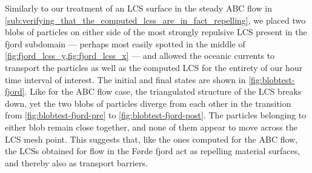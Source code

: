 Similarly to our treatment of an LCS surface in the steady ABC flow in
\cref{sub:verifying_that_the_computed_lcss_are_in_fact_repelling}, we placed
two blobs of particles on either side of the most strongly repulsive LCS
present in the fjord subdomain --- perhaps most easily spotted in the middle
of \cref{fig:fjord_lcss_y,fig:fjord_lcss_x} --- and allowed the oceanic
currents to transport the particles as well as the computed LCS for the
entirety of our  hour time interval of interest. The initial and
final states are shown in \cref{fig:blobtest-fjord}. Like for the ABC flow
case, the triangulated structure of the LCS breaks down, yet the two blobs of
particles diverge from each other in the transition from
\cref{fig:blobtest-fjord-pre} to \cref{fig:blobtest-fjord-post}. The particles
belonging to either blob remain close together, and none of them appear to
move across the LCS mesh point. This suggests that, like the ones computed
for the ABC flow, the LCSs obtained for flow in the Førde fjord act as
repelling material surfaces, and thereby also as transport barriers.




